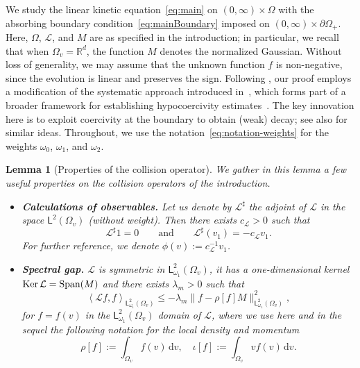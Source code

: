 \documentclass[11pt]{amsart}
\newtheorem{lemma}[theorem]{Lemma}
\theoremstyle{definition}
\theoremstyle{remark}
\numberwithin{equation}{section}
\def\LL{{\mathcal L}}
\newcommand{\dd}{{\, \mathrm d}}
\newcommand{\sfL}{\mathsf{L}}
\newcommand{\EB}[1]{\textcolor{blue}{[\bfseries #1]}}
\begin{document}
We study the linear kinetic equation~\eqref{eq:main} on $(0,\infty) \times \Omega$ with the absorbing boundary condition~\eqref{eq:mainBoundary} imposed on $(0,\infty) \times \partial\Omega_+$. Here, $\Omega$, $\mathcal{L}$, and $M$ are as specified in the introduction; in particular, we recall that when $\Omega_v = \mathbb{R}^d$, the function $M$ denotes the normalized Gaussian. Without loss of generality, we may assume that the unknown function $f$ is non-negative, since the evolution is linear and preserves the sign. %
Following \cite{zbMATH07239825}, our proof employs a modification of the systematic approach introduced in~\cite{dolbeault2015hypocoercivity}, which forms part of a broader framework for establishing hypocoercivity estimates~\cite{Herau-Nier,Herau-2006,Mouhot-Neumann,Mem-villani,MR2679358,MR4581432}. The key innovation here is to exploit coercivity at the boundary to obtain (weak) decay; see also \cite{MR2679358,MR4179249,MR4581432} for similar ideas. Throughout, we use the notation~\eqref{eq:notation-weights} for the weights $\omega_0$, $\omega_1$, and $\omega_2$.
\begin{lemma}[Properties of the collision operator]
  \label{lem:obs}
  We gather in this lemma a few useful properties on the collision operators of the introduction.
  \begin{itemize}
  \item[(i)] \textbf{Calculations of observables.} Let us denote by $\LL^\sharp$ the adjoint of $\LL$ in the space $\sfL^2(\Omega_v)$ (without weight). Then there exists $c_\LL>0$ such that
    \begin{equation}\label{eq:prop-Lsharp}
      \LL^\sharp 1 = 0 \qquad \mbox{and}\qquad \LL^\sharp( v_1) = - c_\LL v_1.
    \end{equation}
    For further reference, we denote $\phi(v) := c_\LL^{-1} v_1$.

  \item[(ii)] \textbf{Spectral gap.} $\LL$ is symmetric in $\sfL^{2}_{\omega_1}(\Omega_v)$, it has a one-dimensional kernel  $\hbox{Ker} \,\LL = \hbox{Span}(M)$ and there exists $\lambda_m > 0$ such that
    \begin{equation}
      \label{eq:sg}
      \left\langle \mathcal Lf , f \right\rangle_{\sfL^2_{\omega_1}(\Omega_v)} \le - \lambda_m \| f - \rho[f] M \|_{\sfL^2_{\omega_1}(\Omega_v)}^2,
    \end{equation}
    for $f=f(v)$ in the $\sfL^2_{\omega_1}(\Omega_v)$ domain of $\mathcal{L}$, where we use here and in the sequel the following notation for the local density and momentum
    \begin{equation}
      \label{eq:rf}
      \rho[f] := \int_{\Omega_v} f(v) \dd v, \quad
      \iota[f] := \int_{\Omega_v} v f(v) \dd v.
    \end{equation}
  \end{itemize}
\end{lemma}
\end{document}
